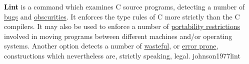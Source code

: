 \documentclass{article}
\begin{document}

  {\textbf{Lint} is a command which examines C source programs, detecting a number of \ul{bugs} and \ul{obscurities}. It enforces the type rules of C more strictly than the C compilers. It may also be used to enforce a number of \ul{portability restrictions} involved in moving programs between different machines and/or operating systems. Another option detects a number of \ul{wasteful}, or \ul{error prone}, constructions which nevertheless are, strictly speaking, legal.}
  {johnson1977lint}

\end{document}
